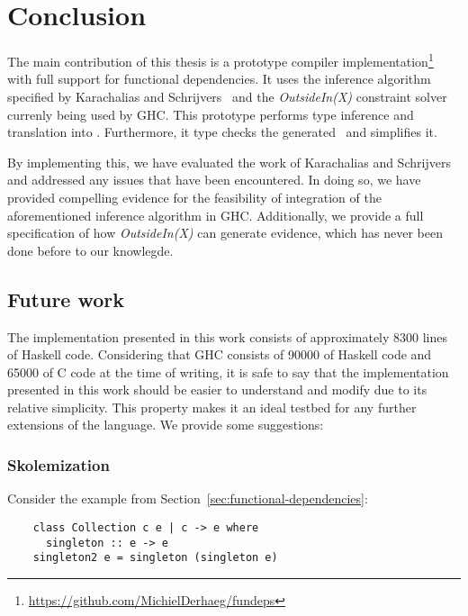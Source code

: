 \chapter{Conclusion}
\label{cha:conclusion}

The main contribution of this thesis is a prototype compiler
implementation\footnote{\url{https://github.com/MichielDerhaeg/fundeps}} with
full support for functional dependencies. It uses the inference algorithm
specified by Karachalias and
Schrijvers~\cite{Karachalias:2017:EFD:3156695.3122966} and the
\textit{OutsideIn(X)}\cite{outsideinx-modular-type-inference-with-local-assumptions}
constraint solver currenly being used by GHC.  This prototype performs type
inference and translation into \systemfc. Furthermore, it type checks the
generated \systemfc ~and simplifies it.

By implementing this, we have evaluated the work of Karachalias and
Schrijvers~\cite{Karachalias:2017:EFD:3156695.3122966} and addressed any issues
that have been encountered. In doing so, we have provided compelling evidence
for the feasibility of integration of the aforementioned inference algorithm in
GHC. Additionally, we provide a full specification of how \textit{OutsideIn(X)}
can generate evidence, which has never been done before to our knowlegde.

\section{Future work}

The implementation presented in this work consists of approximately 8300 lines
of Haskell code. Considering that GHC consists of 90000 of Haskell code and
65000 of C code at the time of writing, it is safe to say that the
implementation presented in this work should be easier to understand and modify
due to its relative simplicity. This property makes it an ideal testbed for
any further extensions of the language. We provide some suggestions:

\subsection{Skolemization}

Consider the example from Section~\ref{sec:functional-dependencies}:
\begin{verbatim}
    class Collection c e | c -> e where
      singleton :: e -> e
    singleton2 e = singleton (singleton e)
\end{verbatim}

